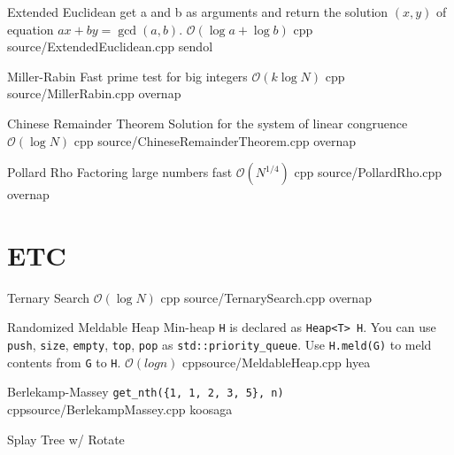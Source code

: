 \documentclass[landscape, 10pt, a4paper, oneside, twocolumn]{extarticle}
\begin{document}
\Algorithm
{Extended Euclidean}
{get a and b as arguments and return the solution $(x, y)$ of equation $ax + by = \gcd(a, b)$.}
{$\mathcal{O}(\log{a} + \log{b})$}
{cpp}
{source/ExtendedEuclidean.cpp}
{sendol}

\Algorithm
{Miller-Rabin}
{Fast prime test for big integers}
{$\mathcal{O}(k\log{N})$}
{cpp}
{source/MillerRabin.cpp}
{overnap}

\Algorithm
{Chinese Remainder Theorem}
{Solution for the system of linear congruence}
{$\mathcal{O}(\log{N})$}
{cpp}
{source/ChineseRemainderTheorem.cpp}
{overnap}

\Algorithm
{Pollard Rho}
{Factoring large numbers fast}
{$\mathcal{O}(N^{1/4})$}
{cpp}
{source/PollardRho.cpp}
{overnap}


\section{ETC}

\Algorithm
{Ternary Search}
{}
{$\mathcal{O}(\log{N})$}
{cpp}
{source/TernarySearch.cpp}
{overnap}

\Algorithm
{Randomized Meldable Heap}
{Min-heap \texttt{H} is declared as \texttt{Heap<T> H}. You can use \texttt{push}, \texttt{size}, \texttt{empty}, \texttt{top}, \texttt{pop} as \texttt{std::priority\_queue}. Use \texttt{H.meld(G)} to meld contents from \texttt{G} to \texttt{H}. }
{$\mathcal{O}(log n)$}
{cpp}{source/MeldableHeap.cpp}
{hyea}

\Algorithm
{Berlekamp-Massey}
{\texttt{get\_nth(\{1, 1, 2, 3, 5\}, n)}}
{}
{cpp}{source/BerlekampMassey.cpp}
{koosaga}

\Algorithm
{Splay Tree w/ Rotate}
{}
{}
{}
{}
{}

\end{document}
